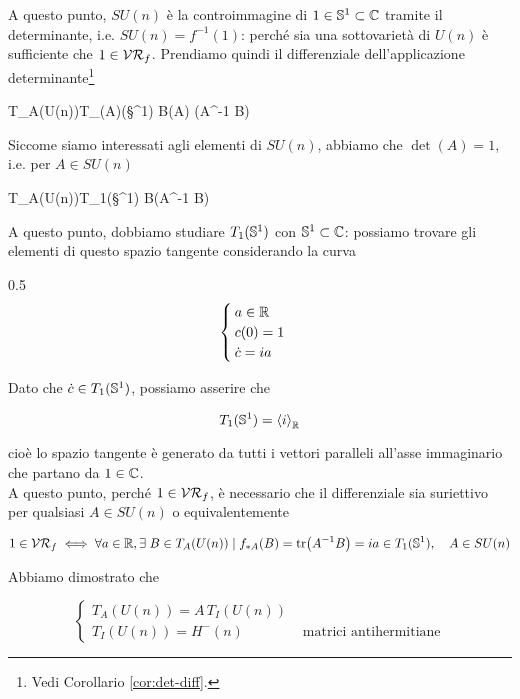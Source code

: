 A questo punto, $ SU(n) $ è la controimmagine di $ 1 \in \S^{1} \subset \C $ tramite il determinante, i.e. $ SU(n) = f^{-1}(1) $: perché sia una sottovarietà di $ U(n) $ è sufficiente che $ 1 \in \VR_{f} $. Prendiamo quindi il differenziale dell'applicazione determinante\footnote{%
	Vedi Corollario \ref{cor:det-diff}.%
}

	{T_{A}(U(n))}{T_{\det(A)}(\S^{1})}
	{B}{\det(A) \tr(A^{-1} B)}
	
Siccome siamo interessati agli elementi di $ SU(n) $, abbiamo che $ \det(A) = 1 $, i.e. per $ A \in SU(n) $

	{T_{A}(U(n))}{T_{1}(\S^{1})}
	{B}{\tr(A^{-1} B)}

A questo punto, dobbiamo studiare $ T_{1}(\S^{1}) $ con $ \S^{1} \subset \C $: possiamo trovare gli elementi di questo spazio tangente considerando la curva

	{0.5}{%
			\begin{equation}
				\begin{cases}
					a \in \R \\
					c(0) = 1 \\
					\dot{c} = i a
				\end{cases}
			\end{equation}
			}

Dato che $ \dot{c} \in T_{1}(\S^{1}) $, possiamo asserire che

\begin{equation}
	T_{1}(\S^{1}) = \ev{i}_{\R}
\end{equation}

cioè lo spazio tangente è generato da tutti i vettori paralleli all'asse immaginario che partano da $ 1 \in \C $.\\
A questo punto, perché $ 1 \in \VR_{f} $, è necessario che il differenziale sia suriettivo per qualsiasi $ A \in SU(n) $ o equivalentemente

\begin{equation}
	1 \in \VR_{f} \iff \forall a \in \R, \E B \in T_{A}(U(n)) \mid f_{*A} (B) = \tr(A^{-1} B) = i a \in T_{1}(\S^{1}) %
	\qcomma A \in SU(n)
\end{equation}

Abbiamo dimostrato che

\begin{equation}
	\begin{cases}
		T_{A}(U(n)) = A \, T_{I}(U(n)) \\
		T_{I}(U(n)) = H^{-}(n) & \text{ matrici antihermitiane}
	\end{cases}
\end{equation}

